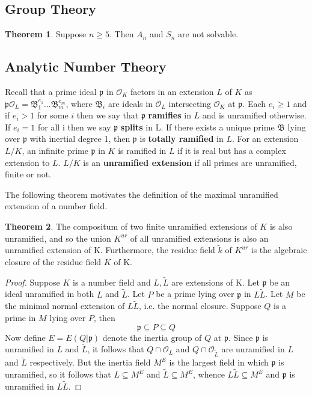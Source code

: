 \documentclass[12pt]{extarticle}
\newcommand{\<}{\langle}
\renewcommand{\>}{\rangle}
\theoremstyle{definition}
\newtheorem{theorem}{Theorem}
\begin{document}
\subsection{Group Theory}
\begin{theorem}
Suppose $n \geq 5$. Then $A_n$ and $S_n$ are not solvable. 
\end{theorem}
\subsection{Analytic Number Theory}
Recall that a prime ideal $\mathfrak{p}$ in $\mathcal{O}_K$ factors in an extension $L$ of $K$ as
$\mathfrak{p}\mathcal{O}_L=\mathfrak{B}_1^{e_1}...\mathfrak{B}_m^{e_m}$, where $\mathfrak{B}_i$ are ideals in $\mathcal{O}_L$ intersecting $\mathcal{O}_K$ at $\mathfrak{p}$. Each $e_i\geq1$ and if $e_i>1$ for some $i$ then we say that $\mathfrak{p}$ \textbf{ramifies} in $L$ and is unramified otherwise. If $e_i=1$ for all i then we say $\mathfrak{p}$ \textbf{splits} in L. If there exists a unique prime $\mathfrak{B}$ lying over $\mathfrak{p}$ with inertial degree 1, then $\mathfrak{p}$ is \textbf{totally ramified} in $L$. For an extension $L/K$, an infinite prime $\mathfrak{p}$ in $K$ is ramified in $L$ if it is real but has a complex extension to $L$. $L/K$ is an \textbf{unramified extension} if all primes are unramified, finite or not. 
\par
The following theorem  motivates the definition of the maximal unramified extension of a number field. 
\begin{theorem}
The compositum of two finite unramified extensions of $K$ is also unramified, and so the union $K^{ur}$ of all unramified extensions is also an unramified extension of K. Furthermore, the residue field $\tilde{k}$ of $K^{ur}$ is the algebraic closure of the residue field $K$ of K.
\end{theorem}
\begin{proof}
    Suppose $K$ is a number field and $L,\tilde{L}$ are extensions of K. Let $\mathfrak{p}$ be an ideal unramified in both $L$ and $\tilde{L}$. Let $P$ be a prime lying over $\mathfrak{p}$ in $L\tilde{L}$. Let $M$ be the minimal normal extension of $L\tilde{L}$, i.e. the normal closure. Suppose $Q$ is a prime in $M$ lying over $P$, then  
    \begin{equation}
        \mathfrak{p}\subseteq P \subseteq Q
    \end{equation}
    Now define $E=E(Q|\mathfrak{p})$ denote the inertia group of $Q$ at $\mathfrak{p}$. 
    Since $\mathfrak{p}$ is unramified in $L$ and $\tilde{L}$, it follows that $Q \cap \mathcal{O}_L$ and $Q \cap \mathcal{O}_{\tilde{L}}$ are unramified in $L$ and $\tilde{L}$ respectively. 
 But the inertia field $M^E$ is the largest field in which $\mathfrak{p}$ is unramified, so it follows that $L\subseteq M^E$ and $\tilde{L} \subseteq M^E $, whence $L\tilde{L}\subseteq M^E$ and $\mathfrak{p}$ is unramified in $L\tilde{L}$.
\end{proof}
\end{document}

